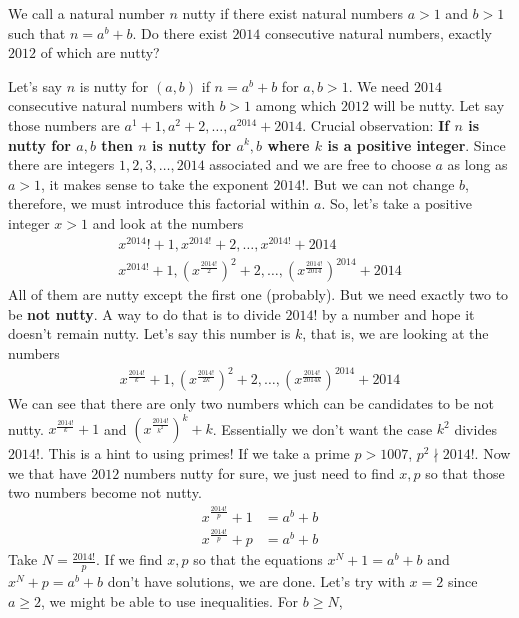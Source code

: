 \documentclass[problems.tex]{subfile}
\begin{document}
	\begin{problem}
		We call a natural number $n$ nutty if there exist natural numbers $a > 1$ and $b > 1$ such that $n = a^b + b$. Do there exist $2014$ consecutive natural numbers, exactly $2012$ of which are nutty?
	\end{problem}
	
	\begin{solution}
		Let's say $n$ is nutty for $(a,b)$ if $n=a^b+b$ for $a,b>1$. We need $2014$ consecutive natural numbers with $b>1$ among which $2012$ will be nutty. Let say those numbers are $a^1+1,a^2+2,\ldots,a^{2014}+2014$. Crucial observation: \textbf{If $n$ is nutty for $a,b$ then $n$ is nutty for $a^k,b$ where $k$ is a positive integer}. Since there are integers $1,2,3,\ldots,2014$ associated and we are free to choose $a $ as long as $a>1$, it makes sense to take the exponent $2014!$. But we can not change $b$, therefore, we must introduce this factorial within $a$. So, let's take a positive integer $x>1$ and look at the numbers 
			\begin{align*}
				x^{2014}!+1,x^{2014!}+2,\ldots,x^{2014!}+2014\\
				x^{2014!}+1,\left(x^{\frac{2014!}{2}}\right)^2+2,\ldots,\left(x^{\frac{2014!}{2014}}\right)^{2014}+2014
			\end{align*}
		All of them are nutty except the first one (probably). But we need exactly two to be \textbf{not nutty}. A way to do that is to divide $2014!$ by a number and hope it doesn't remain nutty. Let's say this number is $k$, that is, we are looking at the numbers 
			\begin{align*}
				x^{\frac{2014!}{k}}+1,\left(x^{\frac{2014!}{2k}}\right)^2+2,\ldots,\left(x^{\frac{2014!}{2014k}}\right)^{2014}+2014
			\end{align*}
		We can see that there are only two numbers which can be candidates to be not nutty. $x^{\frac{2014!}{k}}+1$ and $\left(x^{\frac{2014!}{k^2}}\right)^k+k$. Essentially we don't want the case $k^2$ divides $2014!$. This is a hint to using primes! If we take a prime $p>1007$, $p^2\nmid2014!$. Now we that have $2012$ numbers nutty for sure, we just need to find $x,p$ so that those two numbers become not nutty.
			\begin{align*}
				x^{\frac{2014!}{p}}+1 & = a^b+b\\
				x^{\frac{2014!}{p}}+p & = a^b+b
			\end{align*}
		Take $N = \frac{2014!}{p}$. If we find $x,p$ so that the equations $x^N+1=a^b+b$ and $x^N+p = a^b+b$ don't have solutions, we are done. Let's try with $x=2$ since $a\geq2$, we might be able to use inequalities. For $b\geq N$,

\end{solution}
\end{document}
